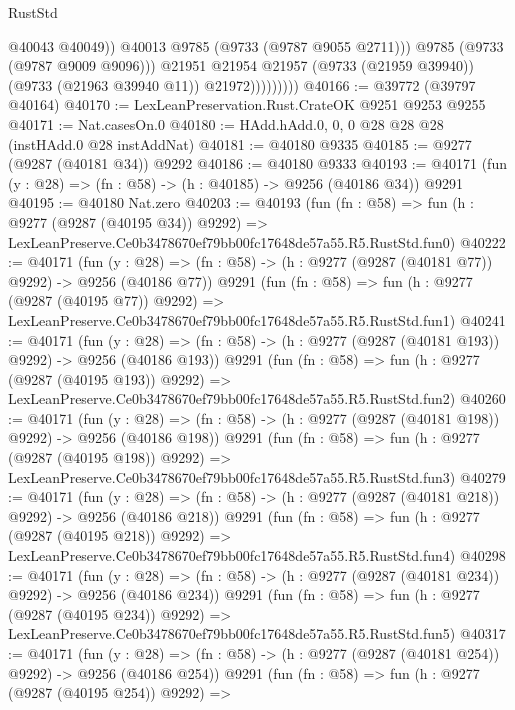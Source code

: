 \begin{lexlean}{RustStd}
\begin{coremodule}
                              @40043
                              @40049))
                          @40013
                          @9785
                          (@9733 (@9787 @9055 @2711)))
                        @9785
                        (@9733 (@9787 @9009 @9096)))
                      @21951
                      @21954
                      @21957
                      (@9733 (@21959 @39940))
                      (@9733 (@21963 @39940 @11))
                      @21972)))))))))
@40166 := @39772 (@39797 @40164)
@40170 := LexLeanPreservation.Rust.CrateOK @9251 @9253 @9255
@40171 := Nat.casesOn.{0}
@40180 := HAdd.hAdd.{0, 0, 0} @28 @28 @28 (instHAdd.{0} @28 instAddNat)
@40181 := @40180 @9335
@40185 := @9277 (@9287 (@40181 @34)) @9292
@40186 := @40180 @9333
@40193 := @40171 (fun (y : @28) => (fn : @58) -> (h : @40185) -> @9256 (@40186 @34)) @9291
@40195 := @40180 Nat.zero
@40203 := @40193
    (fun (fn : @58) =>
    fun (h : @9277 (@9287 (@40195 @34)) @9292) =>
    LexLeanPreserve.Ce0b3478670ef79bb00fc17648de57a55.R5.RustStd.fun0)
@40222 := @40171
    (fun (y : @28) => (fn : @58) -> (h : @9277 (@9287 (@40181 @77)) @9292) -> @9256 (@40186 @77))
    @9291
    (fun (fn : @58) =>
    fun (h : @9277 (@9287 (@40195 @77)) @9292) =>
    LexLeanPreserve.Ce0b3478670ef79bb00fc17648de57a55.R5.RustStd.fun1)
@40241 := @40171
    (fun (y : @28) => (fn : @58) -> (h : @9277 (@9287 (@40181 @193)) @9292) -> @9256 (@40186 @193))
    @9291
    (fun (fn : @58) =>
    fun (h : @9277 (@9287 (@40195 @193)) @9292) =>
    LexLeanPreserve.Ce0b3478670ef79bb00fc17648de57a55.R5.RustStd.fun2)
@40260 := @40171
    (fun (y : @28) => (fn : @58) -> (h : @9277 (@9287 (@40181 @198)) @9292) -> @9256 (@40186 @198))
    @9291
    (fun (fn : @58) =>
    fun (h : @9277 (@9287 (@40195 @198)) @9292) =>
    LexLeanPreserve.Ce0b3478670ef79bb00fc17648de57a55.R5.RustStd.fun3)
@40279 := @40171
    (fun (y : @28) => (fn : @58) -> (h : @9277 (@9287 (@40181 @218)) @9292) -> @9256 (@40186 @218))
    @9291
    (fun (fn : @58) =>
    fun (h : @9277 (@9287 (@40195 @218)) @9292) =>
    LexLeanPreserve.Ce0b3478670ef79bb00fc17648de57a55.R5.RustStd.fun4)
@40298 := @40171
    (fun (y : @28) => (fn : @58) -> (h : @9277 (@9287 (@40181 @234)) @9292) -> @9256 (@40186 @234))
    @9291
    (fun (fn : @58) =>
    fun (h : @9277 (@9287 (@40195 @234)) @9292) =>
    LexLeanPreserve.Ce0b3478670ef79bb00fc17648de57a55.R5.RustStd.fun5)
@40317 := @40171
    (fun (y : @28) => (fn : @58) -> (h : @9277 (@9287 (@40181 @254)) @9292) -> @9256 (@40186 @254))
    @9291
    (fun (fn : @58) =>
    fun (h : @9277 (@9287 (@40195 @254)) @9292) =>

\end{coremodule}
\end{lexlean}
